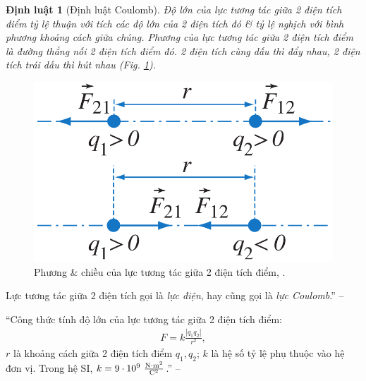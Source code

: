 \documentclass[oneside]{book}
\numberwithin{equation}{section}
\newtheorem{dinhluat}{Định luật}[section]
\begin{document}
\begin{dinhluat}[Định luật Coulomb]
	\label{dinh luat: Coulomb}
	Độ lớn của lực tương tác giữa 2 điện tích điểm tỷ lệ thuận với tích các độ lớn của 2 điện tích đó \& tỷ lệ nghịch với bình phương khoảng cách giữa chúng. Phương của lực tương tác giữa 2 điện tích điểm là đường thẳng nối 2 điện tích điểm đó. 2 điện tích cùng dấu thì đẩy nhau, 2 điện tích trái dấu thì hút nhau (Fig. \ref{fig:luc tuong tac giua 2 dien tich diem}).
\end{dinhluat}

\begin{figure}[H]
	\centering
	\includegraphics[scale=0.15]{luc_tuong_tac_giua_2_dien_tich_diem}
	\caption{Phương \& chiều của lực tương tác giữa 2 điện tích điểm, \cite[Hình 1.6, p. 7]{SGK_Vat_Ly_11_nang_cao}.}
	\label{fig:luc tuong tac giua 2 dien tich diem}
\end{figure}
Lực tương tác giữa 2 điện tích gọi là \textit{lực điện}, hay cũng gọi là \textit{lực Coulomb}.'' -- \cite[p. 7]{SGK_Vat_Ly_11_nang_cao}

``Công thức tính độ lớn của lực tương tác giữa 2 điện tích điểm:
\begin{align}
	\label{luc tuong tac giua 2 dien tich diem}
	F = k\frac{|q_1q_2|}{r^2},
\end{align}
$r$ là khoảng cách giữa 2 điện tích điểm $q_1,q_2$; $k$ là hệ số tỷ lệ phụ thuộc vào hệ đơn vị. Trong hệ SI, $k = 9\cdot 10^9\ \frac{\rm N\cdot m^2}{\rm C^2}$.'' -- \cite[p. 8]{SGK_Vat_Ly_11_nang_cao}
\end{document}
